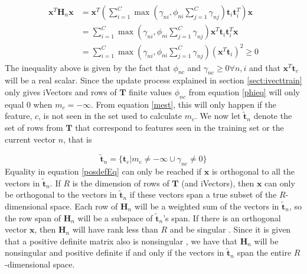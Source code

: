 \begin{align}
\mathbf{x}^T\mathbf{H}_n\mathbf{x} &= \mathbf{x}^T\left(\sum_{i=1}^C\max(\gamma_{ni}, \phi_{ni}\sum_{j=1}^{C}\gamma_{nj})\mathbf{t}_i\mathbf{t}_i^T\right)\mathbf{x} \nonumber \\
&= \sum_{i=1}^C\max(\gamma_{ni}, \phi_{ni}\sum_{j=1}^{C}\gamma_{nj})\mathbf{x}^T\mathbf{t}_i\mathbf{t}_i^T\mathbf{x} \label{posdefEq}\\
&= \sum_{i=1}^C\max(\gamma_{ni}, \phi_{ni}\sum_{j=1}^{C}\gamma_{nj})(\mathbf{x}^T\mathbf{t}_i)^2 \geq 0 \nonumber
\end{align}
The inequality above is given by the fact that $\phi_{nc}$ and $\gamma_{nc} \geq 0 \forall n, i$ and that $\mathbf{x}^T\mathbf{t}_c$ will be a real scalar. Since the update process explained in section \ref{sect:ivecttrain} only gives iVectors and rows of $\mathbf{T}$ finite values $\phi_{nc}$ from equation \ref{phieq} will only equal 0 when $m_c = -\infty$. From equation \ref{mest}, this will only happen if the feature, $c$, is not seen in the set used to calculate $m_c$. We now let $\mathbf{\tilde{t}}_n$ denote the set of rows from $\mathbf{T}$ that correspond to features seen in the training set or the current vector $n$, that is

\begin{equation*}
\mathbf{\tilde{t}}_n = \{\mathbf{t}_c | m_c \neq -\infty \cup \gamma_{nc} \neq 0\}
\end{equation*}
Equality in equation \ref{posdefEq} can only be reached if $\mathbf{x}$ is orthogonal to all the vectors in $\mathbf{\tilde{t}}_n$. If $R$ is the dimension of rows of $\mathbf{T}$ (and iVectors), then $\mathbf{x}$ can only be orthogonal to the vectors in $\mathbf{\tilde{t}}_n$ if these vectors span a true subset of the $R$-dimensional space. Each row of $\mathbf{H}_n$ will be a weighted sum of the vectors in $\mathbf{\tilde{t}}_n$, so the row span of $\mathbf{H}_n$ will be a subspace of $\mathbf{\tilde{t}}_n$'s span. If there is an orthogonal vector $\mathbf{x}$, then $\mathbf{H}_n$ will have rank less than $R$ and be singular \cite[p. 54]{matte3}. Since it is given that a positive definite matrix also is nonsingular \cite[p. 760]{cormen},  we have that $\mathbf{H}_n$ will be nonsingular and positive definite if and only if the vectors in $\mathbf{\tilde{t}}_n$ span the entire $R$-dimensional space.


